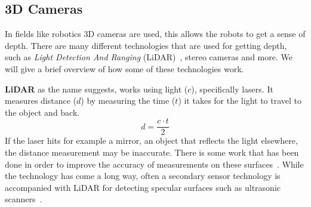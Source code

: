 \begin{figure}
    \centering
    \qquad
    \caption{}
\end{figure}


\subsection{3D Cameras}\label{section:3Dcameras}
In fields like robotics 3D cameras are used, this allows the robots to get a
sense of depth. There are many different technologies that are used for getting
depth, such as \textit{Light Detection And Ranging}
(LiDAR)~\cite{henley23lidar}, stereo cameras and more. We will give a brief
overview of how some of these technologies work.

\textbf{LiDAR} as the name suggests, works using light ($c$), specifically
lasers. It measures distance ($d$) by measuring the time ($t$) it takes for the
light to travel to the object and back.
\[
    d = \frac{c \cdot t}{2}
\]
If the laser hits for example a mirror, an object that reflects the light
elsewhere, the distance measurement may be inaccurate. There is some work that
has been done in order to improve the accuracy of measurements on these
surfaces~\cite{foster2013visagge, henley23lidar}. While the technology has come
a long way, often a secondary sensor technology is accompanied with LiDAR for
detecting specular surfaces such as ultrasonic scanners~\cite{diosi2004advanced}.

